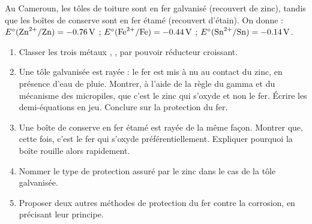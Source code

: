 \documentclass[11pt]{article}
\begin{document}
\begin{exercice}
Au Cameroun, les tôles de toiture sont en fer galvanisé (recouvert de zinc), tandis que les boîtes de conserve sont en fer étamé (recouvert d'étain). On donne : $E^\circ(\ce{Zn^2+}/\ce{Zn}) = \SI{-0,76}{V}$ ; $E^\circ(\ce{Fe^2+}/\ce{Fe}) = \SI{-0,44}{V}$ ; $E^\circ(\ce{Sn^2+}/\ce{Sn}) = \SI{-0,14}{V}$.
\begin{enumerate}
\item Classer les trois métaux , ,  par pouvoir réducteur croissant.
\item Une tôle galvanisée est rayée : le fer est mis à nu au contact du zinc, en présence d'eau de pluie. Montrer, à l'aide de la règle du gamma et du mécanisme des micropiles, que c'est le zinc qui s'oxyde et non le fer. Écrire les demi-équations en jeu. Conclure sur la protection du fer.
\item Une boîte de conserve en fer étamé est rayée de la même façon. Montrer que, cette fois, c'est le fer qui s'oxyde préférentiellement. Expliquer pourquoi la boîte rouille alors rapidement.
\item Nommer le type de protection assuré par le zinc dans le cas de la tôle galvanisée.
\item Proposer deux autres méthodes de protection du fer contre la corrosion, en précisant leur principe.
\end{enumerate}
\end{exercice}
\end{document}
